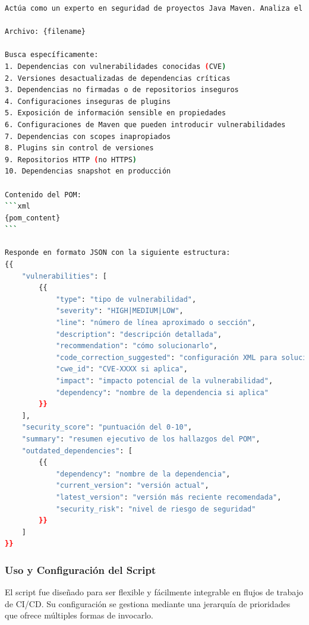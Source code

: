 \begin{lstlisting}[language=bash, caption={Prompt para el análisis de seguridad de ficheros POM.}, label={lst:prompt_pom}]
Actúa como un experto en seguridad de proyectos Java Maven. Analiza el siguiente archivo POM para identificar vulnerabilidades de seguridad y problemas de configuración:

Archivo: {filename}

Busca específicamente:
1. Dependencias con vulnerabilidades conocidas (CVE)
2. Versiones desactualizadas de dependencias críticas
3. Dependencias no firmadas o de repositorios inseguros
4. Configuraciones inseguras de plugins
5. Exposición de información sensible en propiedades
6. Configuraciones de Maven que pueden introducir vulnerabilidades
7. Dependencias con scopes inapropiados
8. Plugins sin control de versiones
9. Repositorios HTTP (no HTTPS)
10. Dependencias snapshot en producción

Contenido del POM:
```xml
{pom_content}
```

Responde en formato JSON con la siguiente estructura:
{{
    "vulnerabilities": [
        {{
            "type": "tipo de vulnerabilidad",
            "severity": "HIGH|MEDIUM|LOW",
            "line": "número de línea aproximado o sección",
            "description": "descripción detallada",
            "recommendation": "cómo solucionarlo",
            "code_correction_suggested": "configuración XML para solucionar",
            "cwe_id": "CVE-XXXX si aplica",
            "impact": "impacto potencial de la vulnerabilidad",
            "dependency": "nombre de la dependencia si aplica"
        }}
    ],
    "security_score": "puntuación del 0-10",
    "summary": "resumen ejecutivo de los hallazgos del POM",
    "outdated_dependencies": [
        {{
            "dependency": "nombre de la dependencia",
            "current_version": "versión actual",
            "latest_version": "versión más reciente recomendada",
            "security_risk": "nivel de riesgo de seguridad"
        }}
    ]
}}
\end{lstlisting}

\subsubsection{Uso y Configuración del Script}
El script fue diseñado para ser flexible y fácilmente integrable en flujos de trabajo de CI/CD. Su configuración se gestiona mediante una jerarquía de prioridades que ofrece múltiples formas de invocarlo.

